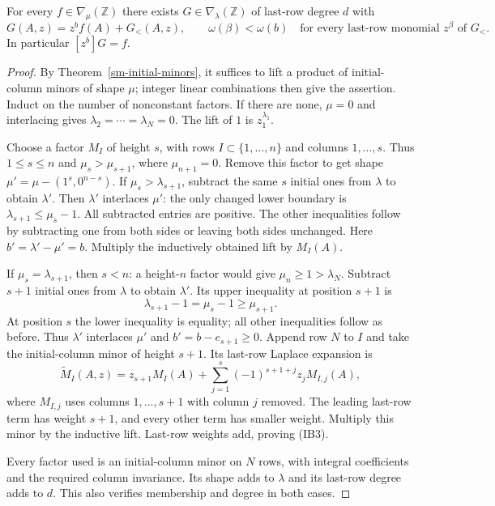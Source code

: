 \begin{lemma}\label{ib-integral-lift}
For every $f\in\nabla_\mu(\mathbb Z)$ there exists
$G\in\nabla_\lambda(\mathbb Z)$ of last-row degree $d$ with
\[
 G(A,z)=z^b f(A)+G_{<}(A,z),\qquad
 \omega(\beta)<\omega(b)
       \quad\text{for every last-row monomial }z^\beta\text{ of }G_{<}.
 \tag{IB3}
\]
In particular $[z^b]G=f$.
\end{lemma}
\begin{proof}
By Theorem~\ref{sm-initial-minors}, it suffices to lift a
product of initial-column minors of shape $\mu$; integer
linear combinations then give the assertion.
Induct on the number of nonconstant factors.
If there are none, $\mu=0$ and interlacing gives
$\lambda_2=\cdots=\lambda_N=0$.
The lift of $1$ is $z_1^{\lambda_1}$.

Choose a factor $M_I$ of height $s$, with rows
$I\subset\{1,\ldots,n\}$ and columns $1,\ldots,s$.
Thus $1\le s\le n$ and $\mu_s>\mu_{s+1}$, where
$\mu_{n+1}=0$.  Remove this factor to get shape
$\mu'=\mu-(1^s,0^{n-s})$.
If $\mu_s>\lambda_{s+1}$, subtract the same $s$
initial ones from $\lambda$ to obtain $\lambda'$.
Then $\lambda'$ interlaces $\mu'$: the only changed
lower boundary is $\lambda_{s+1}\le\mu_s-1$.
All subtracted entries are positive.  The other
inequalities follow by subtracting one from both
sides or leaving both sides unchanged.
Here $b'=\lambda'-\mu'=b$.
Multiply the inductively obtained lift by $M_I(A)$.

If $\mu_s=\lambda_{s+1}$, then $s<n$:
a height-$n$ factor would give $\mu_n\ge1>\lambda_N$.
Subtract $s+1$ initial ones from $\lambda$ to obtain
$\lambda'$.  Its upper inequality at position $s+1$ is
\[
              \lambda_{s+1}-1=\mu_s-1\ge\mu_{s+1}.
\]
At position $s$ the lower inequality is equality;
all other inequalities follow as before.
Thus $\lambda'$ interlaces $\mu'$ and
$b'=b-e_{s+1}\ge0$.
Append row $N$ to $I$ and take the initial-column
minor of height $s+1$.  Its last-row Laplace expansion is
\[
 \widetilde M_I(A,z)
   =z_{s+1}M_I(A)+
       \sum_{j=1}^{s}(-1)^{s+1+j}z_jM_{I,j}(A),
 \tag{IB4}
\]
where $M_{I,j}$ uses columns $1,\ldots,s+1$ with
column $j$ removed.  The leading last-row term has
weight $s+1$, and every other term has smaller weight.
Multiply this minor by the inductive lift.
Last-row weights add, proving (IB3).

Every factor used is an initial-column minor on $N$
rows, with integral coefficients and the required
column invariance.  Its shape adds to $\lambda$ and
its last-row degree adds to $d$.  This also verifies
membership and degree in both cases.
\end{proof}

